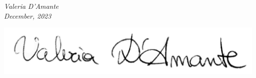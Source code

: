 \documentclass[paper=a4,fontsize=12pt]{article} %
\newcommand{\NewPart}[1]{\section*{\uppercase{#1}}}
\newcommand{\EducationEntry}[4]{
	\noindent \textbf{#1} \hfill      %
	{#2} \par  %
	\noindent \textit{#3} \par        %
	\noindent\hangindent=2em\hangafter=0 \small #4 %
	\normalsize \par}
\begin{document}
\begin{flushright}
                \textit{Valeria D'Amante}   \\  
                \textit{December, 2023}\\ \vspace{5mm}
                
                \includegraphics[scale=0.25]{firmavd.png}
            \end{flushright} 


	\newpage
	
	
	
\end{document}
